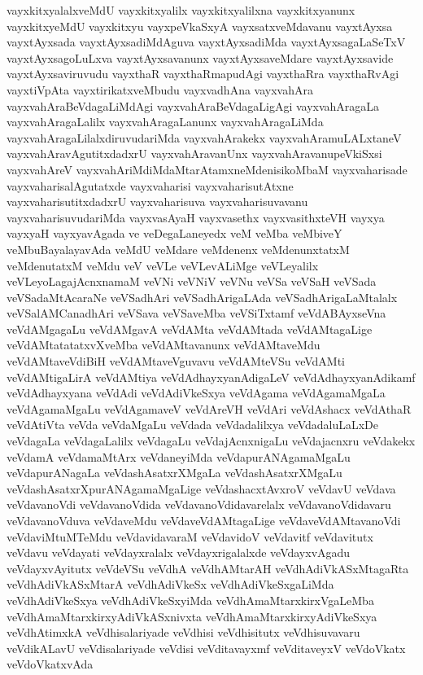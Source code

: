 {vayxkitxyalalxveMdU
vayxkitxyalilx
vayxkitxyalilxna
vayxkitxyanunx
vayxkitxyeMdU
vayxkitxyu
vayxpeVkaSxyA
vayxsatxveMdavanu
vayxtAyxsa
vayxtAyxsada
vayxtAyxsadiMdAguva
vayxtAyxsadiMda
vayxtAyxsagaLaSeTxV
vayxtAyxsagoLuLxva
vayxtAyxsavanunx
vayxtAyxsaveMdare
vayxtAyxsavide
vayxtAyxsaviruvudu
vayxthaR
vayxthaRmapudAgi
vayxthaRra
vayxthaRvAgi
vayxtiVpAta
vayxtirikatxveMbudu
vayxvadhAna
vayxvahAra
vayxvahAraBeVdagaLiMdAgi
vayxvahAraBeVdagaLigAgi
vayxvahAragaLa
vayxvahAragaLalilx
vayxvahAragaLanunx
vayxvahAragaLiMda
vayxvahAragaLilalxdiruvudariMda
vayxvahArakekx
vayxvahAramuLALxtaneV
vayxvahAravAgutitxdadxrU
vayxvahAravanUnx
vayxvahAravanupeVkiSxsi
vayxvahAreV
vayxvahAriMdiMdaMtarAtamxneMdenisikoMbaM
vayxvaharisade
vayxvaharisalAgutatxde
vayxvaharisi
vayxvaharisutAtxne
vayxvaharisutitxdadxrU
vayxvaharisuva
vayxvaharisuvavanu
vayxvaharisuvudariMda
vayxvasAyaH
vayxvasethx
vayxvasithxteVH
vayxya
vayxyaH
vayxyavAgada
ve
veDegaLaneyedx
veM
veMba
veMbiveY
veMbuBayalayavAda
veMdU
veMdare
veMdenenx
veMdenunxtatxM
veMdenutatxM
veMdu
veV
veVLe
veVLevALiMge
veVLeyalilx
veVLeyoLagajAcnxnamaM
veVNi
veVNiV
veVNu
veVSa
veVSaH
veVSada
veVSadaMtAcaraNe
veVSadhAri
veVSadhArigaLAda
veVSadhArigaLaMtalalx
veVSalAMCanadhAri
veVSava
veVSaveMba
veVSiTxtamf
veVdABAyxseVna
veVdAMgagaLu
veVdAMgavA
veVdAMta
veVdAMtada
veVdAMtagaLige
veVdAMtatatatxvXveMba
veVdAMtavanunx
veVdAMtaveMdu
veVdAMtaveVdiBiH
veVdAMtaveVguvavu
veVdAMteVSu
veVdAMti
veVdAMtigaLirA
veVdAMtiya
veVdAdhayxyanAdigaLeV
veVdAdhayxyanAdikamf
veVdAdhayxyana
veVdAdi
veVdAdiVkeSxya
veVdAgama
veVdAgamaMgaLa
veVdAgamaMgaLu
veVdAgamaveV
veVdAreVH
veVdAri
veVdAshacx
veVdAthaR
veVdAtiVta
veVda
veVdaMgaLu
veVdada
veVdadalilxya
veVdadaluLaLxDe
veVdagaLa
veVdagaLalilx
veVdagaLu
veVdajAcnxnigaLu
veVdajacnxru
veVdakekx
veVdamA
veVdamaMtArx
veVdaneyiMda
veVdapurANAgamaMgaLu
veVdapurANagaLa
veVdashAsatxrXMgaLa
veVdashAsatxrXMgaLu
veVdashAsatxrXpurANAgamaMgaLige
veVdashacxtAvxroV
veVdavU
veVdava
veVdavanoVdi
veVdavanoVdida
veVdavanoVdidavarelalx
veVdavanoVdidavaru
veVdavanoVduva
veVdaveMdu
veVdaveVdAMtagaLige
veVdaveVdAMtavanoVdi
veVdaviMtuMTeMdu
veVdavidavaraM
veVdavidoV
veVdavitf
veVdavitutx
veVdavu
veVdayati
veVdayxralalx
veVdayxrigalalxde
veVdayxvAgadu
veVdayxvAyitutx
veVdeVSu
veVdhA
veVdhAMtarAH
veVdhAdiVkASxMtagaRta
veVdhAdiVkASxMtarA
veVdhAdiVkeSx
veVdhAdiVkeSxgaLiMda
veVdhAdiVkeSxya
veVdhAdiVkeSxyiMda
veVdhAmaMtarxkirxVgaLeMba
veVdhAmaMtarxkirxyAdiVkASxnivxta
veVdhAmaMtarxkirxyAdiVkeSxya
veVdhAtimxkA
veVdhisalariyade
veVdhisi
veVdhisitutx
veVdhisuvavaru
veVdikALavU
veVdisalariyade
veVdisi
veVditavayxmf
veVditaveyxV
veVdoVkatx
veVdoVkatxvAda
}
